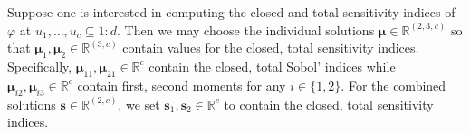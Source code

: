 \documentclass[graybox]{svmult}
\begin{document}
Suppose one is interested in computing the closed and total sensitivity indices of $\varphi$ at $u_1,\dots,u_c \subseteq 1:d$. Then we may choose the individual solutions $\boldsymbol{\mu} \in \mathbb{R}^{(2, 3, c)}$ so that
$\boldsymbol{\mu}_1,\boldsymbol{\mu}_2 \in \mathbb{R}^{(3,c)}$ contain values for the closed, total sensitivity indices. Specifically,  $\boldsymbol{\mu}_{11},\boldsymbol{\mu}_{21} \in \mathbb{R}^c$ contain the closed, total Sobol' indices while $\boldsymbol{\mu}_{i2}, \boldsymbol{\mu}_{i3} \in \mathbb{R}^c$ contain first, second moments for any $i \in \{1,2\}$. For the combined solutions $\boldsymbol{s} \in \mathbb{R}^{(2, c)}$, we set $\boldsymbol{s}_1, \boldsymbol{s}_2 \in \mathbb{R}^c$ to contain the closed, total sensitivity indices. 
\end{document}
